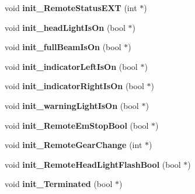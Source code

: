 \begin{DoxyCompactItemize}
\item 
\hypertarget{class_remote_thread_ad69aba3296b67a50b8dff3c22f7e89a0}{}void {\bfseries init\+\_\+\+Remote\+Status\+E\+X\+T} (int $\ast$)\label{class_remote_thread_ad69aba3296b67a50b8dff3c22f7e89a0}

\item 
\hypertarget{class_remote_thread_a659f51b16da9cdb8caf52f0c885d2be6}{}void {\bfseries init\+\_\+head\+Light\+Is\+On} (bool $\ast$)\label{class_remote_thread_a659f51b16da9cdb8caf52f0c885d2be6}

\item 
\hypertarget{class_remote_thread_a6d1ea3bd7e4a7ff4c2e0665699bae8f9}{}void {\bfseries init\+\_\+full\+Beam\+Is\+On} (bool $\ast$)\label{class_remote_thread_a6d1ea3bd7e4a7ff4c2e0665699bae8f9}

\item 
\hypertarget{class_remote_thread_a3b2cadf9a68f30c60520ec7b4ef2dcce}{}void {\bfseries init\+\_\+indicator\+Left\+Is\+On} (bool $\ast$)\label{class_remote_thread_a3b2cadf9a68f30c60520ec7b4ef2dcce}

\item 
\hypertarget{class_remote_thread_a254eceb6b4f4089e7b102abdb420af6d}{}void {\bfseries init\+\_\+indicator\+Right\+Is\+On} (bool $\ast$)\label{class_remote_thread_a254eceb6b4f4089e7b102abdb420af6d}

\item 
\hypertarget{class_remote_thread_ac925727df6675d74636db3ee90fb2717}{}void {\bfseries init\+\_\+warning\+Light\+Is\+On} (bool $\ast$)\label{class_remote_thread_ac925727df6675d74636db3ee90fb2717}

\item 
\hypertarget{class_remote_thread_af15651120a1ed1a43d54fe0b562a68c9}{}void {\bfseries init\+\_\+\+Remote\+Em\+Stop\+Bool} (bool $\ast$)\label{class_remote_thread_af15651120a1ed1a43d54fe0b562a68c9}

\item 
\hypertarget{class_remote_thread_afbfe2a847389c2633f3c1f5b3ef282dc}{}void {\bfseries init\+\_\+\+Remote\+Gear\+Change} (int $\ast$)\label{class_remote_thread_afbfe2a847389c2633f3c1f5b3ef282dc}

\item 
\hypertarget{class_remote_thread_a996adb972df55c57ef020e199a2edc80}{}void {\bfseries init\+\_\+\+Remote\+Head\+Light\+Flash\+Bool} (bool $\ast$)\label{class_remote_thread_a996adb972df55c57ef020e199a2edc80}

\item 
\hypertarget{class_remote_thread_ae5f3eaba7830d9bdf5ca2f05c212b160}{}void {\bfseries init\+\_\+\+Terminated} (bool $\ast$)\label{class_remote_thread_ae5f3eaba7830d9bdf5ca2f05c212b160}


\end{DoxyCompactItemize}

